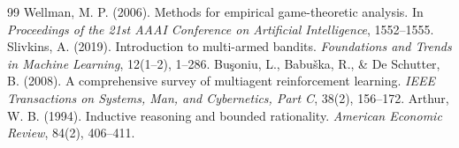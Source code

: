 \documentclass{article}
\begin{document}
\begin{thebibliography}{99}
 Wellman, M. P. (2006). Methods for empirical game-theoretic analysis. In \textit{Proceedings of the 21st AAAI Conference on Artificial Intelligence}, 1552--1555.
 Slivkins, A. (2019). Introduction to multi-armed bandits. \textit{Foundations and Trends in Machine Learning}, 12(1--2), 1--286.
 Bu\c{s}oniu, L., Babu\v{s}ka, R., \& De Schutter, B. (2008). A comprehensive survey of multiagent reinforcement learning. \textit{IEEE Transactions on Systems, Man, and Cybernetics, Part C}, 38(2), 156--172.
 Arthur, W. B. (1994). Inductive reasoning and bounded rationality. \textit{American Economic Review}, 84(2), 406--411.
\end{thebibliography}
\end{document}
